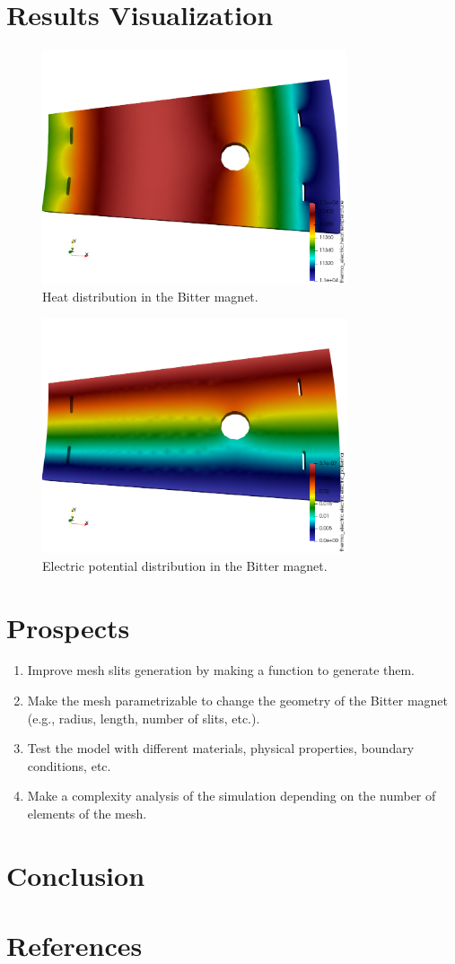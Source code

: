 \documentclass[12pt]{article}
\begin{document}
\section{Results Visualization}
\begin{figure}[H]
  \centering
  \includegraphics[width=0.8\textwidth]{images/heat.png}
  \caption{Heat distribution in the Bitter magnet.}
\end{figure}
\begin{figure}[H]
  \centering
  \includegraphics[width=0.8\textwidth]{images/electric_potential.png}
  \caption{Electric potential distribution in the Bitter magnet.}
\end{figure}

\section{Prospects}
\begin{enumerate}
  \item Improve mesh slits generation by making a function to generate them.
  \item Make the mesh parametrizable to change the geometry of the Bitter magnet
    (e.g., radius, length, number of slits, etc.).
  \item Test the model with different materials, physical properties, boundary conditions, etc.
  \item Make a complexity analysis of the simulation depending on the number of elements of the mesh.
\end{enumerate}

\section{Conclusion}

\newpage

\section{References}
\printbibliography
\end{document}
